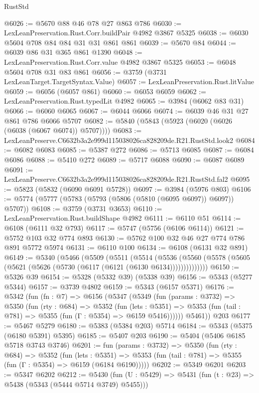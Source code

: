 \begin{lexlean}{RustStd}
\begin{coremodule}
@6026 := @5670 @88 @46 @78 @27 @863 @786
@6030 := LexLeanPreservation.Rust.Corr.buildPair @4982 @3867 @5325
@6038 := @6030 @5604 @708 @84 @84 @31 @31 @861 @861
@6039 := @5670 @84
@6044 := @6039 @86 @31 @365 @861 @1390
@6048 := LexLeanPreservation.Rust.Corr.value @4982 @3867 @5325
@6053 := @6048 @5604 @708 @31 @83 @861
@6056 := @3759 (@3731 LexLeanTarget.TargetSyntax.Value)
@6057 := LexLeanPreservation.Rust.litValue
@6059 := @6056 (@6057 @861)
@6060 := @6053 @6059
@6062 := LexLeanPreservation.Rust.typedLit @4982
@6065 := @3984 (@6062 @83 @31)
@6066 := @6060 @6065
@6067 := @6044 @6066
@6074 := @6039 @46 @31 @27 @861 @786 @6066 @5707
@6082 := @5840 (@5843 (@5923 (@6020 (@6026 (@6038 (@6067 @6074)) @5707))))
@6083 := LexLeanPreserve.C6632b3a2e999d115038026ca828209de.R21.RustStd.look2
@6084 := @6082 @6083
@6085 := @5387 @272
@6086 := @5713 @6085
@6087 := @6084 @6086
@6088 := @5410 @272
@6089 := @5717 @6088
@6090 := @6087 @6089
@6091 := LexLeanPreserve.C6632b3a2e999d115038026ca828209de.R21.RustStd.fal2
@6095 := @5823 (@5832 (@6090 @6091 @5728))
@6097 := @3984 (@5976 @803)
@6106 := @5774 (@5777 (@5783 (@5793 (@5806 (@5810 (@6095 @6097)) @6097)) @5707))
@6108 := @3759 (@3731 @3653)
@6110 := LexLeanPreservation.Rust.buildShape @4982
@6111 := @6110 @51
@6114 := @6108 (@6111 @32 @793)
@6117 := @5747 (@5756 (@6106 @6114))
@6121 := @5752 @103 @32 @774 @893
@6130 := @5762 @100 @32 @46 @27 @774 @786 @891 @5772 @5974
@6131 := @6110 @100
@6134 := @6108 (@6131 @32 @891)
@6149 := @5340
    (@5466
      (@5509
        (@5511
          (@5514
            (@5536
              (@5560 (@5578 (@5605 (@5621 (@5626 (@5730 (@6117 (@6121 (@6130 @6134))))))))))))))
@6150 := @5326 @39
@6154 := @5328 (@5332 @39) (@5338 @39)
@6156 := @5343 (@5277 @5344)
@6157 := @3739 @4802
@6159 := @5343 (@6157 @5371)
@6176 := @5342
    (fun (fn : @7) =>
    @6156
      (@5347
        (@5349
          (fun (params : @3732) =>
          @5350
            (fun (rty : @684) =>
            @5352
              (fun (lets : @5351) =>
              @5353 (fun (tail : @781) => @5355 (fun (Γ : @5354) => @6159 @5416))))))
        @5461))
    @203
@6177 := @5467 @5279
@6180 := @5383 (@5384 @203) @5714
@6184 := @5343 (@5375 (@6180 @5391) @5395)
@6185 := @5407 @203
@6190 := @5404 (@5406 @6185 @5718 @3743 @3746)
@6201 := fun (params : @3732) =>
  @5350
    (fun (rty : @684) =>
    @5352
      (fun (lets : @5351) =>
      @5353 (fun (tail : @781) => @5355 (fun (Γ : @5354) => @6159 (@6184 @6190)))))
@6202 := @5349 @6201
@6203 := @5347 @6202
@6212 := @5430 (fun (U : @5429) => @5431 (fun (t : @23) => @5438 (@5343 (@5444 @5714 @3749) @5455)))

\end{coremodule}
\end{lexlean}
